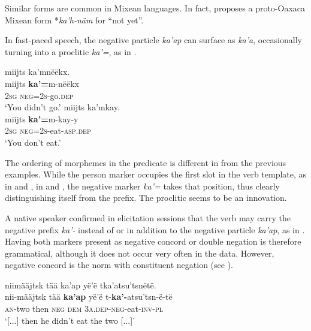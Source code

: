 \documentclass[output=paper,colorlinks,citecolor=brown,draft]{langscibook}
\begin{document}
    \z
\z

Similar forms are common in Mixean languages. In fact, \citet[342]{Wichmann1995} proposes a proto-Oaxaca Mixean form *\textit{ka’h-näm} for “not yet”. 

In fast-paced speech, the negative particle \textit{ka’ap} can surface as \textit{ka’a}, occasionally turning into a proclitic \textit{ka’=}, as in . 

\ea\label{ex:mix:13}
    \ea\label{ex:mix:13a}
        \glll miijts ka’mnëëkx. \\ 
             miijts \textbf{ka’=}m-nëëkx \\
             \textsc{2sg} \textsc{neg=2s}{}-go.\textsc{dep} \\
        \glt ‘You didn’t go.’
    \ex\label{ex:mix:13b}
        \glll miijts ka’mkay. \\
              miijts \textbf{ka’=}m-kay-y  \\
              \textsc{2sg} \textsc{neg=2s-}eat-\textsc{asp.dep}\\
        \glt  ‘You don’t eat.’
    \z
\z 

The ordering of morphemes in the predicate is different in  from the previous examples. While the person marker occupies the first slot in the verb template, as in  and , in  and , the negative marker \textit{ka’=} takes that position, thus clearly distinguishing itself from the prefix. The proclitic seems to be an innovation.

A native speaker confirmed in elicitation sessions that the verb may carry the negative prefix \textit{ka’-} instead of or in addition to the negative particle \textit{ka’ap}, as in . Having both markers present as negative concord \citep{Hoeksema2009} or double negation \citep{Dryer2005-wals112} is therefore grammatical, although it does not occur very often in the data. However, negative concord is the norm with constituent negation (see ).

\ea\label{ex:mix:14}
    \glll niimääjtsk tää ka’ap yë’ë tka’atsu’tsnëtë. \\
          nii-määjtsk tää \textbf{ka’ap} yë’ë t-\textbf{ka’-}atsu’tsn-ë-të  \\
          \textsc{an-}two then \textsc{neg} \textsc{dem} 3\textsc{a.dep-neg}{}-eat-\textsc{inv-pl} \\
    \glt ‘[...] then he didn’t eat the two [...]’
\z
\end{document}
